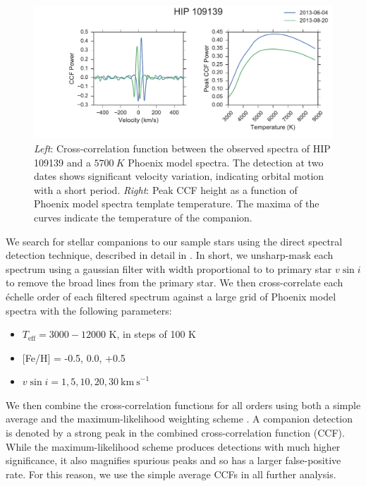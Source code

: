 \documentclass{emulateapj}
\begin{document}
\begin{figure}
\includegraphics[width=\textwidth]{HIP_109139.pdf}
\caption{\emph{Left}: Cross-correlation function between the observed spectra of HIP 109139 and a $5700\ K$ Phoenix model spectra. The detection at two dates shows significant velocity variation, indicating orbital motion with a short period. \emph{Right}: Peak CCF height as a function of Phoenix model spectra template temperature. The maxima of the curves indicate the temperature of the companion.}
\label{fig:ccf}
\end{figure}

We search for stellar companions to our sample stars using the direct spectral detection technique, described in detail in \citet{Gullikson2016}. In short, we unsharp-mask each spectrum using a gaussian filter with width proportional to to primary star $v\sin{i}$ to remove the broad lines from the primary star. We then cross-correlate each \'echelle order of each filtered spectrum against a large grid of Phoenix model spectra \citep{Husser2013_b} with the following parameters:

\begin{itemize}
\item $T_\mathrm{eff} = 3000-12000$ K, in steps of 100 K
\item {[}Fe/H{]} = -0.5, 0.0, +0.5
\item $v\sin{i} = 1, 5, 10, 20, 30 \ \mathrm{km\ s}^{-1}$
\end{itemize}


We then combine the cross-correlation functions for all orders using both a simple average and the maximum-likelihood weighting scheme \citep{Zucker2003}. A companion detection is denoted by a strong peak in the combined cross-correlation function (CCF). While the maximum-likelihood scheme produces detections with much higher significance, it also magnifies spurious peaks and so has a larger false-positive rate. For this reason, we use the simple average CCFs in all further analysis.
\end{document}
